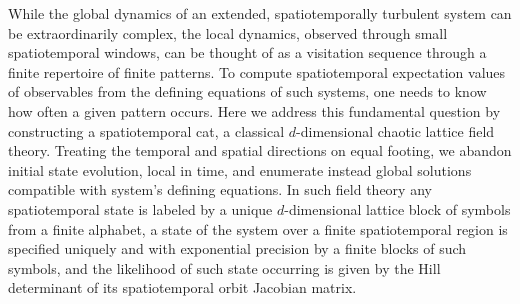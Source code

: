 

While the global dynamics of an extended, spatiotemporally
turbulent system can be extraordinarily complex, the local dynamics,
observed through small spatiotemporal windows, can be thought of
as a visitation sequence through a finite repertoire of finite patterns.
To compute spatiotemporal expectation values of observables from the
defining equations of such systems,  one needs to know how often a given
pattern occurs.
Here we address this fundamental question by constructing a
spatiotemporal cat, a classical $d$-dimensional chaotic lattice field
theory.
Treating the temporal and spatial directions on equal footing, we abandon
initial state evolution, local in time, and enumerate instead global
solutions compatible with system's defining equations.
In such field theory any
spatiotemporal state is labeled by a unique $d$-dimensional lattice block
of symbols from a finite alphabet, a state of the system over a finite
spatiotemporal region is specified uniquely and with exponential
precision by a finite blocks of such symbols, and the likelihood of such
state occurring is given by the Hill determinant of its spatiotemporal
orbit Jacobian matrix.
